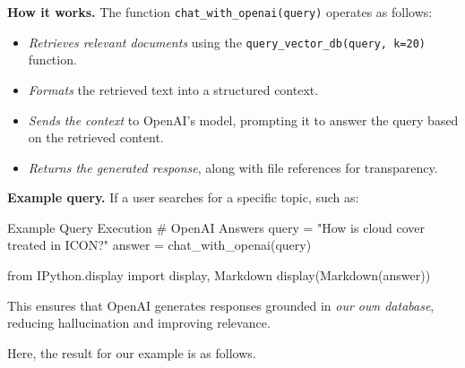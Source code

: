 \textbf{How it works.} The function \texttt{chat\_with\_openai(query)} operates as follows:
\begin{itemize}
    \item \emph{Retrieves relevant documents} using the \texttt{query\_vector\_db(query, k=20)} function.
    \item \emph{Formats} the retrieved text into a structured context.
    \item \emph{Sends the context} to OpenAI’s model, prompting it to answer the query based on the retrieved content.
    \item \emph{Returns the generated response}, along with file references for transparency.
\end{itemize}

\textbf{Example query.} If a user searches for a specific topic, such as:

\begin{codeonly}{Example Query Execution}
# OpenAI Answers
query = "How is cloud cover treated in ICON?"
answer = chat_with_openai(query)

from IPython.display import display, Markdown
display(Markdown(answer))
\end{codeonly}

This ensures that OpenAI generates responses grounded in \emph{our own database}, reducing hallucination and improving relevance.

Here, the result for our example is as follows. 

